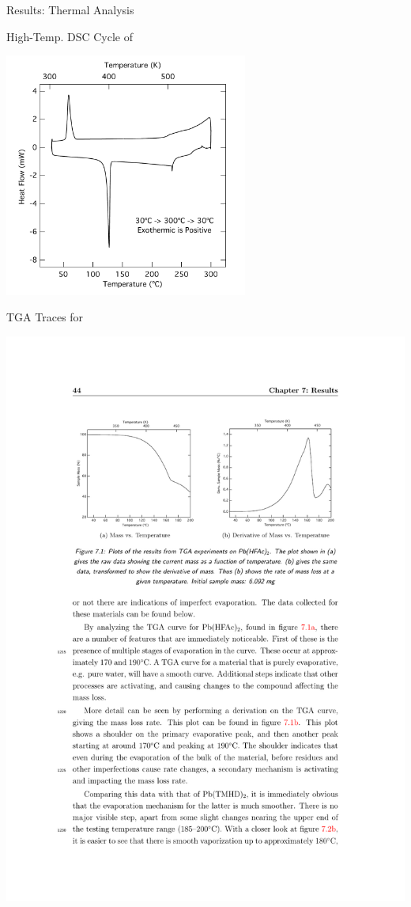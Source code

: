 \documentclass[professionalfont]{beamer}
\begin{document}
\begin{frame}{Results: Thermal Analysis}
\begin{overprint}
\begin{center}
		\end{center}
		\begin{center}
		High-Temp. DSC Cycle of \\
		\centerline{\includegraphics[width=0.6\textwidth]{./graphics/data/dsc/tmhd-300}}%
		\end{center}
		\begin{center}
		TGA Traces for \\
		\vspace{0.5cm}
		\centerline{\includegraphics[width=\textwidth]{./graphics/data/tga/hfac}}

\end{center}
\end{overprint}
\end{frame}
\end{document}
